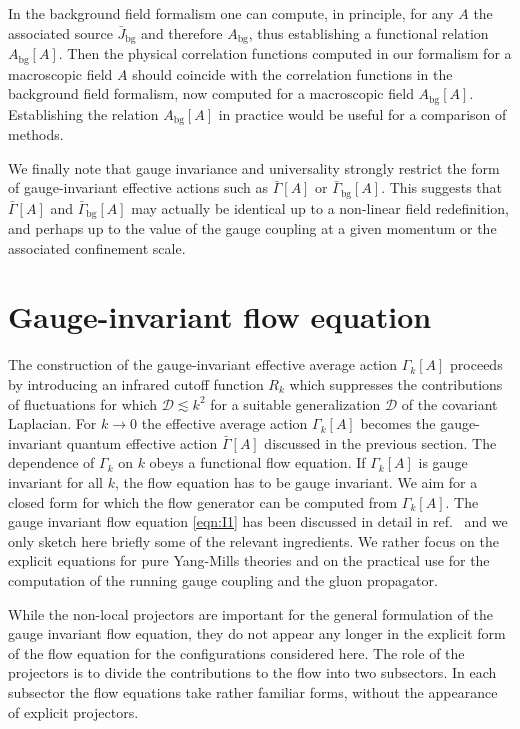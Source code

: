 \documentclass[twocolumn,aps,prd,amsmath,amssymb,preprintnumbers,longbibliography]{revtex4-1}
\numberwithin{equation}{section}
\begin{document}
In the background field formalism one can compute, in principle, for any $A$ the associated source $\bar{J}_\text{bg}$ and therefore $A_\text{bg}$, thus establishing a functional relation $A_\text{bg}[A]$. Then the physical correlation functions computed in our formalism for a macroscopic field $A$ should coincide with the correlation functions in the background field formalism, now computed for a macroscopic field $A_\text{bg}[A]$. Establishing the relation $A_\text{bg}[A]$ in practice would be useful for a comparison of methods.

We finally note that gauge invariance and universality strongly restrict the form of gauge-invariant effective actions such as $\bar\Gamma[A]$ or $\bar\Gamma_\text{bg}[A]$. This suggests that $\bar\Gamma[A]$ and $\bar\Gamma_\text{bg}[A]$ may actually be identical up to a non-linear field redefinition, and perhaps up to the value of the gauge coupling at a given momentum or the associated confinement scale.





\section{Gauge-invariant flow equation}
\label{sec:gauge-invariant flow}

The construction of the gauge-invariant effective average action $\Gamma_k[A]$ proceeds by introducing an infrared cutoff function $R_k$ which suppresses the contributions of fluctuations for which $\mathcal{D} \lesssim k^2$ for a suitable generalization $\mathcal{D}$ of the covariant Laplacian. For $k \to 0$ the effective average action $\Gamma_k[A]$ becomes the gauge-invariant quantum effective action $\bar\Gamma[A]$ discussed in the previous section. The dependence of $\Gamma_{k}$ on $k$ obeys a functional flow equation. If $\Gamma_{k}[A]$ is gauge invariant for all $k$, the flow equation has to be gauge invariant. We aim for a closed form for which the flow generator can be computed from $\Gamma_{k}[A]$. The gauge invariant flow equation \eqref{eqn:I1} has been discussed in detail in ref.~\cite{CWGIF} and we only sketch here briefly some of the relevant ingredients. We rather focus on the explicit equations for pure Yang-Mills theories and on the practical use for the computation of the running gauge coupling and the gluon propagator.

While the non-local projectors are important for the general formulation of the gauge invariant flow equation, they do not appear any longer in the explicit form of the flow equation for the configurations considered here. The role of the projectors is to divide the contributions to the flow into two subsectors. In each subsector the flow equations take rather familiar forms, without the appearance of explicit projectors. 
\end{document}
